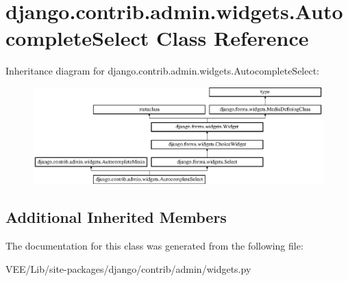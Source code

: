 \hypertarget{classdjango_1_1contrib_1_1admin_1_1widgets_1_1_autocomplete_select}{}\section{django.\+contrib.\+admin.\+widgets.\+Autocomplete\+Select Class Reference}
\label{classdjango_1_1contrib_1_1admin_1_1widgets_1_1_autocomplete_select}
Inheritance diagram for django.\+contrib.\+admin.\+widgets.\+Autocomplete\+Select\+:\begin{figure}[H]
\begin{center}
\leavevmode
\includegraphics[height=3.745820cm]{classdjango_1_1contrib_1_1admin_1_1widgets_1_1_autocomplete_select}
\end{center}
\end{figure}
\subsection*{Additional Inherited Members}


The documentation for this class was generated from the following file\+:\begin{DoxyCompactItemize}
\item 
V\+E\+E/\+Lib/site-\/packages/django/contrib/admin/widgets.\+py\end{DoxyCompactItemize}
